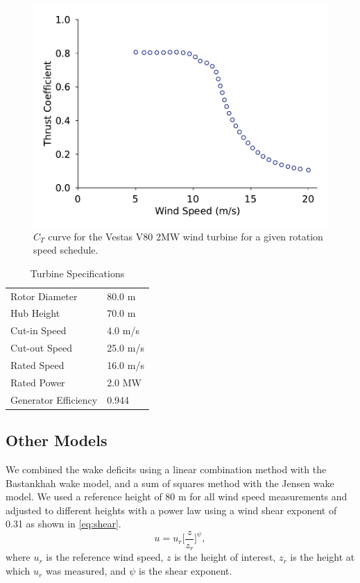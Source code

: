\documentclass[hidelinks,sort&compress,AMA,STIX1COL]{WileyNJD-v2}
\providecommand{\DIFaddbeginFL}{} %
\providecommand{\DIFaddendFL}{} %
\providecommand{\DIFdelendFL}{} %
\newcommand{\DIFaddincludegraphics}[2][]{{\color{blue}\fbox{\DIFOincludegraphics[#1]{#2}}}} %
\DeclareRobustCommand{\DIFaddbeginFL}{\DIFOaddbeginFL \let\includegraphics\DIFaddincludegraphics} %
\DeclareRobustCommand{\DIFaddendFL}{\DIFOaddendFL \let\includegraphics\DIFOincludegraphics} %
\DeclareRobustCommand{\DIFdelendFL}{\DIFOaddendFL \let\includegraphics\DIFOincludegraphics} %
\begin{document}
\begin{figure}[h!]
\begin{minipage}[t]{0.48\textwidth}
\DIFdelendFL \DIFaddbeginFL \includegraphics[width=\textwidth]{inputs/Figure_5.pdf}
		\DIFaddendFL \caption{$C_T$ curve for the Vestas V80 2MW wind turbine \cite{niayifar2016} for a given rotation speed schedule.}
		\label{fig:ct}
	\end{minipage} 
\end{figure}
%
\begin{table}[h!]
	\caption{Turbine Specifications}
	\label{tab:v80}
	\centering
	\begin{tabular}{l l}
		\toprule
		Rotor Diameter & 80.0 m\\
		Hub Height & 70.0 m \\
		Cut-in Speed & 4.0 m/s\\
		Cut-out Speed & 25.0 m/s \\
		Rated Speed & 16.0 m/s \\
		Rated Power & 2.0 MW \\
		Generator Efficiency & 0.944 \\
		\bottomrule
	\end{tabular}
\end{table}

\subsection{Other Models}
We combined the wake deficits using a linear combination method\cite{niayifar2016} with the Bastankhah wake model, and a sum of squares method\cite{katic1986} with the Jensen wake model. We used a reference height of 80 m for all wind speed measurements and adjusted to different heights with a power law using a wind shear exponent of 0.31 as shown in \cref{eq:shear}. 
%
\begin{equation} \label{eq:shear}
u = u_r\bigg[\frac{z}{z_r}\bigg]^\psi,
\end{equation}
%
where $u_r$ is the reference wind speed, $z$ is the height of interest, $z_r$ is the height at which $u_r$ was measured, and $\psi$ is the shear exponent.
\end{document}
